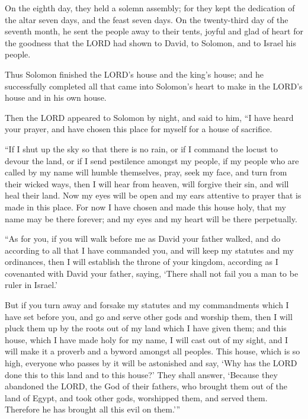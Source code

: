  On the eighth day, they held a solemn assembly; for they
kept the dedication of the altar seven days, and the feast seven days.
 On the twenty-third day of the seventh month, he sent
the people away to their tents, joyful and glad of heart for the
goodness that the LORD had shown to David, to Solomon, and to Israel his
people.

 Thus Solomon finished the LORD's house and the king's
house; and he successfully completed all that came into Solomon's heart
to make in the LORD's house and in his own house.

 Then the LORD appeared to Solomon by night, and said to
him, ``I have heard your prayer, and have chosen this place for myself
for a house of sacrifice.

 ``If I shut up the sky so that there is no rain, or if I
command the locust to devour the land, or if I send pestilence amongst
my people,  if my people who are called by my name will
humble themselves, pray, seek my face, and turn from their wicked ways,
then I will hear from heaven, will forgive their sin, and will heal
their land.  Now my eyes will be open and my ears
attentive to prayer that is made in this place.  For now
I have chosen and made this house holy, that my name may be there
forever; and my eyes and my heart will be there perpetually.

 ``As for you, if you will walk before me as David your
father walked, and do according to all that I have commanded you, and
will keep my statutes and my ordinances,  then I will
establish the throne of your kingdom, according as I covenanted with
David your father, saying, `There shall not fail you a man to be ruler
in Israel.'

 But if you turn away and forsake my statutes and my
commandments which I have set before you, and go and serve other gods
and worship them,  then I will pluck them up by the roots
out of my land which I have given them; and this house, which I have
made holy for my name, I will cast out of my sight, and I will make it a
proverb and a byword amongst all peoples.  This house,
which is so high, everyone who passes by it will be astonished and say,
`Why has the LORD done this to this land and to this house?'
 They shall answer, `Because they abandoned the LORD, the
God of their fathers, who brought them out of the land of Egypt, and
took other gods, worshipped them, and served them. Therefore he has
brought all this evil on them.'''

